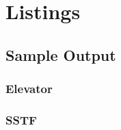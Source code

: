 \documentclass{report}
\begin{document}
\section{Listings} %
%
%
%
%
%
%
%
%
\subsection{Sample Output}
\subsubsection{Elevator}

\subsubsection{SSTF}

\end{document}
